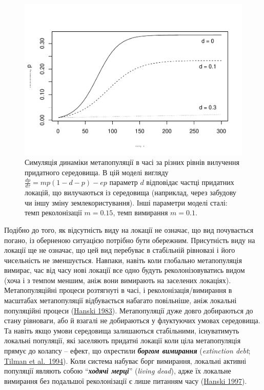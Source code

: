 \documentclass[
  11pt,
]{book}
\begin{document}
\begin{figure}

{\centering \includegraphics{bookdown-demo_files/figure-latex/fig-metapop-d-1} 

}

\caption{Симуляція динаміки метапопуляції в часі за різних рівнів вилучення придатного середовища. В цій моделі вигляду $\frac{dp}{d\tau} = mp(1-d-p) - ep$ параметр $d$ відповідає частці придатних локацій, що вилучаються із середовища (наприклад, через забудову чи іншу зміну землекористування). Інші параметри моделі сталі: темп реколонізації $m = 0.15$, темп вимирання $m = 0.1$.}\label{fig:fig-metapop-d}
\end{figure}

Подібно до того, як відсутність виду на локації не означає, що вид почувається погано, із оберненою ситуацією потрібно бути обережним. Присутність виду на локації ще не означає, що цей вид перебуває в стабільній рівновазі і його чисельність не зменшується. Навпаки, навіть коли глобально метапопуляція вимирає, час від часу нові локації все одно будуть реколонізовуватись видом (хоча і з темпом меншим, аніж вони вимирають на заселених локаціях). Метапопуляційні процеси розтягнуті в часі, і реколонізація/вимирання в масштабах метапопуляції відбувається набагато повільніше, аніж локальні популяційні процеси (\href{htpps://doi.org/10.2307/1939969}{Hanski 1983}). Метапопуляції дуже довго добираються до стану рівноваги, або й взагалі не добираються у флуктуючих умовах середовища. Та навіть якщо умови середовища залишаються стабільними, існуватимуть локальні популяції, які заселяють придатні локації коли ціла метапопуляція прямує до колапсу -- ефект, що охрестили \textbf{\emph{боргом вимирання}} (\emph{extinction debt}; \href{https://doi.org/10.1038/371065a0}{Tilman et al.~1994}). Коли система набуває борг вимирання, локальні активні популяції являють собою ``\textbf{\emph{ходячі мерці}}'' (\emph{living dead}), адже їх локальне вимирання без подальшої реколонізації є лише питанням часу (\href{htpps://doi.org/10.1016/B978-012323445-2/50007-9}{Hanski 1997}).
\end{document}
